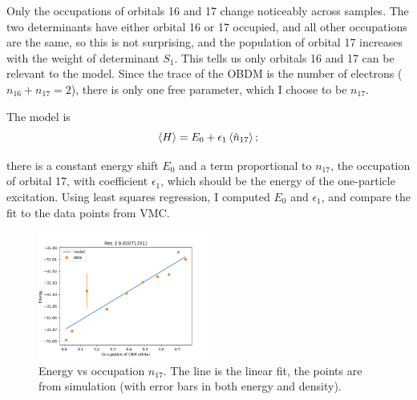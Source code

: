 
Only the occupations of orbitals 16 and 17 change noticeably across samples.
The two determinants have either orbital 16 or 17 occupied, and all other occupations are the same, so this is not surprising, and the population of orbital 17 increases with the weight of determinant $S_1$.
This tells us only orbitals 16 and 17 can be relevant to the model.
Since the trace of the OBDM is the number of electrons ($n_{16}+n_{17}=2$), there is only one free parameter, which I choose to be $n_{17}$.


The model is 
\[
\left< H \right> = E_0 + \epsilon_1 \left< \hat{n}_{17} \right>;
\]

there is a constant energy shift $E_0$ and a term proportional to $n_{17}$, the occupation of orbital 17, with coefficient $\epsilon_{1}$, which should be the energy of the one-particle excitation.
Using least squares regression, I computed $E_0$ and $\epsilon_1$, and compare the fit to the data points from VMC.

\begin{figure}
\includegraphics[width=0.5\textwidth]{images/vmc_2orb_model.png}
\caption{
Energy vs occupation $n_{17}$. The line is the linear fit, the points are from simulation (with error bars in both energy and density).
}
\label{fig:model}
\end{figure}





